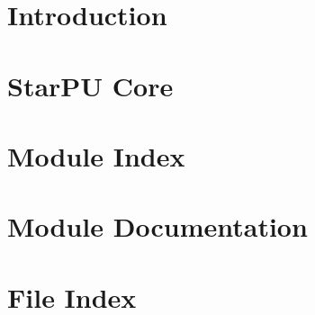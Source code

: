 %
%
%
%
%
\newcommand\starputitle{StarPU Internal Handbook}
\setcounter{tocdepth}{1}


\chapter{Introduction}
\label{index}
\hypertarget{index}{}


\chapter{Star\+PU Core}
\label{StarPUCore}
\hypertarget{StarPUCore}{}


\chapter{Module Index}


\chapter{Module Documentation}
\label{ModuleDocumentation}
\hypertarget{ModuleDocumentation}{}



\chapter{File Index}


